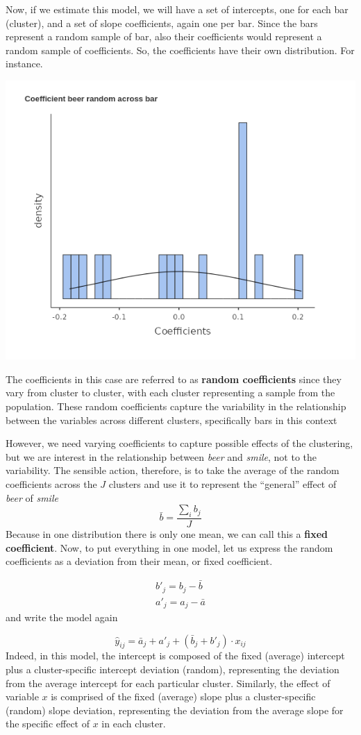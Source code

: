 \documentclass[
]{book}
\begin{document}
Now, if we estimate this model, we will have a set of intercepts, one for each bar (cluster), and a set of slope coefficients, again one per bar. Since the bars represent a random sample of bar, also their coefficients would represent a random sample of coefficients. So, the coefficients have their own distribution. For instance.

\includegraphics[width=0.8\linewidth]{bookletpics/4_theory_plot4}

The coefficients in this case are referred to as \textbf{random coefficients} since they vary from cluster to cluster, with each cluster representing a sample from the population. These random coefficients capture the variability in the relationship between the variables across different clusters, specifically bars in this context

However, we need varying coefficients to capture possible effects of the clustering, but we are interest in the relationship between \emph{beer} and \emph{smile}, not to the variability. The sensible action, therefore, is to take the average of the random coefficients across the \(J\) clusters and use it to represent the ``general'' effect of \emph{beer} of \emph{smile}
\[
\bar{b}=\frac{\sum_i{b_j}}{J} 
\]
Because in one distribution there is only one mean, we can call this a \textbf{fixed coefficient}. Now, to put everything in one model, let us express the random coefficients as a deviation from their mean, or fixed coefficient.

\[
\begin{aligned}
b'_j=b_j-\bar{b}\\ 
a'_j=a_j-\bar{a} 
\end{aligned}
\]
and write the model again

\[ 
\hat{y}_{ij}=\bar{a}_j+a'_j+ (\bar{b}_j+b'_j)  \cdot x_{ij}
\]
Indeed, in this model, the intercept is composed of the fixed (average) intercept plus a cluster-specific intercept deviation (random), representing the deviation from the average intercept for each particular cluster. Similarly, the effect of variable \(x\) is comprised of the fixed (average) slope plus a cluster-specific (random) slope deviation, representing the deviation from the average slope for the specific effect of \(x\) in each cluster.
\end{document}

